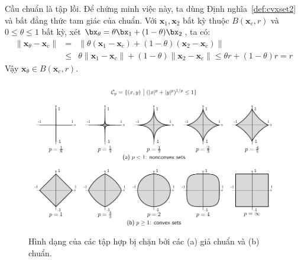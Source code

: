 Cầu chuẩn là tập lồi. Để chứng minh việc này, ta dùng Định nghĩa~\ref{def:cvxset2} và
bất đẳng thức tam giác của chuẩn. Với $\mathbf{x}_1, \mathbf{x}_2$ bất kỳ thuộc
$B(\mathbf{x}_c, r)$ và $0 \leq \theta \leq 1$ bất kỳ, xét $\bx_{\theta} =
\theta \bx_1 + (1 - \theta)\bx_2$, ta có: 
\begin{eqnarray*} 
\|\mathbf{x}_{\theta} - \mathbf{x}_c\| &=& \|\theta(\mathbf{x}_1 - \mathbf{x}_c)  + (1 - \theta) (\mathbf{x}_2 - \mathbf{x}_c)\| \\\ 
&\leq& \theta \|\mathbf{x}_1 - \mathbf{x}_c\| + (1 - \theta)\|\mathbf{x}_2 - \mathbf{x}_c\| 
\leq \theta r + ( 1 - \theta) r = r 
\end{eqnarray*} 
Vậy $\mathbf{x}_{\theta} \in B(\mathbf{x}_c, r)$. 
 
 

 
\begin{figure}[t]
\centering
    \includegraphics[width = \textwidth]{Chapters/08_ConvexOptimization/16_convexity/latex/normballs.pdf}
    \caption[]{Hình dạng của các tập hợp bị chặn bởi  các (a) giả chuẩn và
    (b) chuẩn.} \label{fig:16_normballs}
\end{figure}


